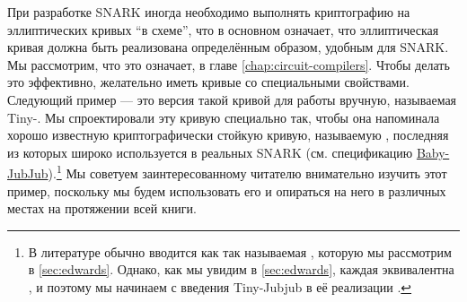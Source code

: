 При разработке SNARK иногда необходимо выполнять криптографию на эллиптических кривых ``в схеме'', что в основном означает, что эллиптическая кривая должна быть реализована определённым образом, удобным для SNARK. Мы рассмотрим, что это означает, в главе \ref{chap:circuit-compilers}. Чтобы делать это эффективно, желательно иметь кривые со специальными свойствами. Следующий пример — это версия такой кривой для работы вручную, называемая Tiny-. Мы спроектировали эту кривую специально так, чтобы она напоминала хорошо известную криптографически стойкую кривую, называемую , последняя из которых широко используется в реальных SNARK (см. спецификацию \href{https://github.com/iden3/iden3-docs/blob/master/source/iden3_repos/research/publications/zkproof-standards-workshop-2/baby-jubjub/baby-jubjub.rst}{Baby-JubJub}).\footnote{В литературе  обычно вводится как так называемая , которую мы рассмотрим в \ref{sec:edwards}. Однако, как мы увидим в \ref{sec:edwards}, каждая  эквивалентна , и поэтому мы начинаем с введения Tiny-Jubjub в её реализации .}
Мы советуем заинтересованному читателю внимательно изучить этот пример, поскольку мы будем использовать его и опираться на него в различных местах на протяжении всей книги. 

